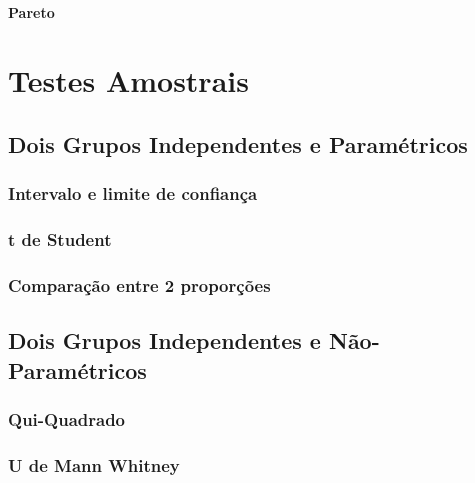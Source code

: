 \documentclass[
]{book}
\begin{document}
\hypertarget{pareto}{%
\subsection{Pareto}\label{pareto}}

\hypertarget{part-testes-amostrais}{%
\part{Testes Amostrais}\label{part-testes-amostrais}}

\hypertarget{dois-grupos-independentes-e-paramuxe9tricos}{%
\chapter{Dois Grupos Independentes e Paramétricos}\label{dois-grupos-independentes-e-paramuxe9tricos}}

\hypertarget{intervalo-e-limite-de-confianuxe7a}{%
\section{Intervalo e limite de confiança}\label{intervalo-e-limite-de-confianuxe7a}}

\hypertarget{t-de-student-1}{%
\section{t de Student}\label{t-de-student-1}}

\hypertarget{comparauxe7uxe3o-entre-2-proporuxe7uxf5es}{%
\section{Comparação entre 2 proporções}\label{comparauxe7uxe3o-entre-2-proporuxe7uxf5es}}

\hypertarget{dois-grupos-independentes-e-nuxe3o-paramuxe9tricos}{%
\chapter{Dois Grupos Independentes e Não-Paramétricos}\label{dois-grupos-independentes-e-nuxe3o-paramuxe9tricos}}

\hypertarget{qui-quadrado}{%
\section{Qui-Quadrado}\label{qui-quadrado}}

\hypertarget{u-de-mann-whitney}{%
\section{U de Mann Whitney}\label{u-de-mann-whitney}}
\end{document}
